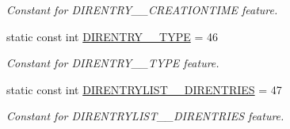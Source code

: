 \begin{DoxyCompactItemize}
\begin{DoxyCompactList}\small\item\em Constant for DIRENTRY\_\-\_\-CREATIONTIME feature. \item\end{DoxyCompactList}\item 
\hypertarget{classFMS__Data_1_1FMS__DataPackage_a903a395de7bb3f7479aad0060f111d4d}{
static const int \hyperlink{classFMS__Data_1_1FMS__DataPackage_a903a395de7bb3f7479aad0060f111d4d}{DIRENTRY\_\-\_\-TYPE} = 46}
\label{classFMS__Data_1_1FMS__DataPackage_a903a395de7bb3f7479aad0060f111d4d}

\begin{DoxyCompactList}\small\item\em Constant for DIRENTRY\_\-\_\-TYPE feature. \item\end{DoxyCompactList}\item 
\hypertarget{classFMS__Data_1_1FMS__DataPackage_ad4a2de876f056e8076ae7eee9d237507}{
static const int \hyperlink{classFMS__Data_1_1FMS__DataPackage_ad4a2de876f056e8076ae7eee9d237507}{DIRENTRYLIST\_\-\_\-DIRENTRIES} = 47}
\label{classFMS__Data_1_1FMS__DataPackage_ad4a2de876f056e8076ae7eee9d237507}

\begin{DoxyCompactList}\small\item\em Constant for DIRENTRYLIST\_\-\_\-DIRENTRIES feature. \item\end{DoxyCompactList}\end{DoxyCompactItemize}

